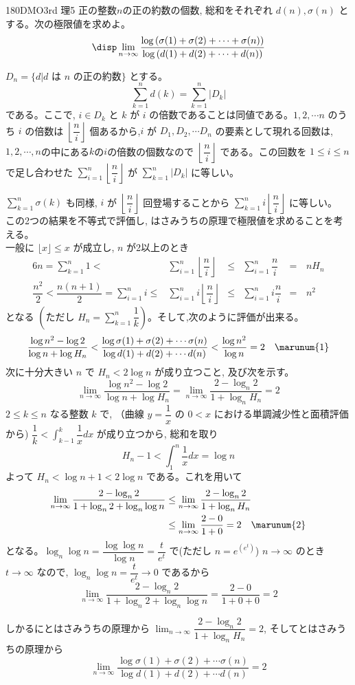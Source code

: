 \begin{thm}{180}{}{DMO3rd 理5}
 正の整数$n$の正の約数の個数, 総和をそれぞれ $d(n), \sigma (n)$ とする。次の極限値を求めよ。
 \[\disp\lim_{n\to \infty}\dfrac{\log{(\sigma(1) +\sigma(2) +\cdots +\sigma (n))}}{\log{(d(1)+d(2)+\cdots +d(n))}}\]
\end{thm}

$D_n=\{d| \mbox{$d$ は $n$ の正の約数}\}$ とする。
\[\displaystyle\sum_{k=1}^n d(k) = \displaystyle\sum_{k=1}^n|D_k|\] である。ここで, $i\in D_k$ と $k$ が $i$ の倍数であることは同値である。$1,2,\cdots n$ のうち $i$ の倍数は $\left\lfloor\dfrac{n}{i}\right\rfloor$ 個あるから,$i$ が $D_1, D_2, \cdots D_n$ の要素として現れる回数は, $1,2,\cdots, n$の中にある$k$の$i$の倍数の個数なので $\left\lfloor\dfrac{n}{i}\right\rfloor$ である。この回数を $1\le i\le n$ で足し合わせた $\displaystyle\sum_{i=1}^n \left\lfloor\dfrac{n}{i}\right\rfloor$ が $\displaystyle\sum_{k=1}^n |D_k|$ に等しい。

$\displaystyle\sum_{k=1}^n \sigma (k)$ も同様, $i$ が $\left\lfloor\dfrac{n}{i}\right\rfloor$ 回登場することから $\displaystyle\sum_{k=1}^n i\left\lfloor\dfrac{n}{i}\right\rfloor$ に等しい。 \\
この2つの結果を不等式で評価し, はさみうちの原理で極限値を求めることを考える。\\
一般に $\lfloor x\rfloor\le x$ が成立し, $n$ が2以上のとき
\begin{alignat*}{6}
n=\sum_{k=1}^n 1 < &\sum_{i=1}^n \left\lfloor\dfrac{n}{i}\right\rfloor& \le &\sum_{i=1}^n \dfrac{n}{i}& =&\,nH_n\\
\dfrac{n^2}{2}<\dfrac{n(n+1)}{2}=\sum_{i=1}^n i \le &\sum_{i=1}^n i\left\lfloor\dfrac{n}{i}\right\rfloor& \le &\sum_{i=1}^n i\dfrac{n}{i}& =&\,n^2
\end{alignat*}
となる $(\text{ただし}\,\,H_n=\displaystyle\sum_{k=1}^n\dfrac{1}{k})$。そして,次のように評価が出来る。
\begin{align*}
\dfrac{\log{n^2}-\log{2}}{\log{n}+\log{H_n}} < \dfrac{\log{\sigma(1) +\sigma (2)+\cdots \sigma (n)}}{\log{d(1)+d(2)+\cdots d(n)}} < \dfrac{\log{n^2}}{\log{n}} = 2 \quad \marunum{1}
\end{align*}
次に十分大きい $n$ で $H_n<2\log{n}$ が成り立つこと, 及び次を示す。
\[ \lim_{n\to\infty}\dfrac{\log{n^2}-\log{2}}{\log{n}+\log{H_n}}=\lim_{n\to\infty}\dfrac{2-\log_n{2}}{1+\log_n{H_n}}=2 \]
$2\le k\le n$ なる整数 $k$ で, （曲線 $y=\dfrac{1}{x}$ の $0<x$ における単調減少性と面積評価から) $\dfrac{1}{k}<\displaystyle\int_{k-1}^{k} \dfrac{1}{x} dx$ が成り立つから, 総和を取り
\[ H_n-1<\displaystyle\int_1^{n}\dfrac{1}{x} dx=\log{n} \]
よって $H_n<\log{n}+1<2\log{n}$ である。これを用いて
\begin{align*}
\lim_{n\to\infty}\dfrac{2-\log_n{2}}{1+\log_n{2}+\log_n{\log{n}}}&\le\lim_{n\to\infty}\dfrac{2-\log_n{2}}{1+\log_n{H_n}}\\
&\le\lim_{n\to\infty}\dfrac{2-0}{1+0}=2 \quad \marunum{2}
\end{align*}
となる。$\log_n{\log{n}}=\dfrac{\log{\log{n}}}{\log{n}}=\dfrac{t}{e^t}$ で(ただし $n= e^{(e^t)}$) $n\rightarrow \infty$ のとき $t\rightarrow \infty$ なので, $\log_n{\log{n}}=\dfrac{t}{e^t}\rightarrow 0$ であるから
\[ \lim_{n\to\infty}\dfrac{2-\log_n{2}}{1+\log_n{2}+\log_n{\log{n}}}=\dfrac{2-0}{1+0+0}=2 \]

しかるにとはさみうちの原理から $\displaystyle\lim_{n\to\infty}\dfrac{2-\log_n{2}}{1+\log_n{H_n}}=2$, そしてとはさみうちの原理から
\[\displaystyle\lim_{n\to\infty }\dfrac{\log{\sigma(1) +\sigma (2)+\cdots \sigma (n)}}{\log{d(1)+d(2)+\cdots d(n)}}=2\]
